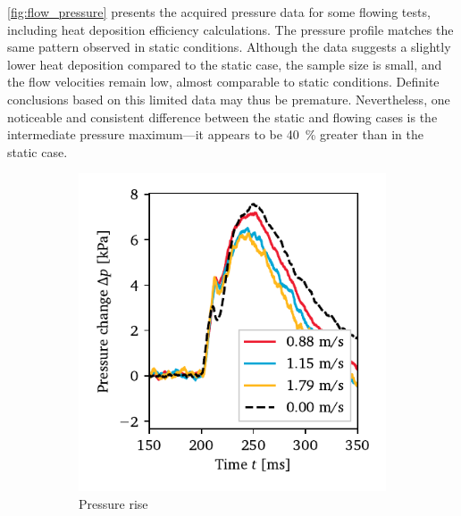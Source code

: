         \autoref{fig:flow_pressure} presents the acquired pressure data for some flowing tests, including heat deposition efficiency calculations. The pressure profile matches the same pattern observed in static conditions. Although the data suggests a slightly lower heat deposition compared to the static case, the sample size is small, and the flow velocities remain low, almost comparable to static conditions. Definite conclusions based on this limited data may thus be premature. Nevertheless, one noticeable and consistent difference between the static and flowing cases is the intermediate pressure maximum---it appears to be 40~\% greater than in the static case. 

        \begin{figure}[h]
            \centering
            \begin{subfigure}[t]{0.47\textwidth}
                \centering
                \includegraphics[width=\textwidth]{assets/5 results/flow_deltap}
                \caption{Pressure rise}
                \label{fig:flow_pressure_rise}
            \end{subfigure}
            \hfill
            \begin{subfigure}[t]{0.47\textwidth}
                \centering

\end{subfigure}
\end{figure}
